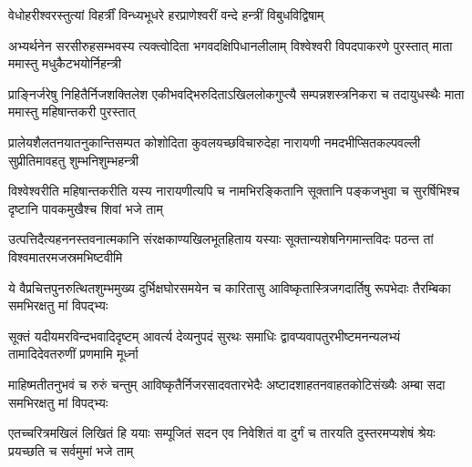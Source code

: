 

\twolineshloka
{वेधोहरीश्वरस्तुत्यां विहर्त्रीं विन्ध्यभूधरे}
{हरप्राणेश्वरीं वन्दे हन्त्रीं विबुधविद्विषाम्}%

\fourlineindentedshloka
{अभ्यर्थनेन सरसीरुहसम्भवस्य}
{त्यक्त्वोदिता भगवदक्षिपिधानलीलाम्}
{विश्वेश्वरी विपदपाकरणे पुरस्तात्}
{माता ममास्तु मधुकैटभयोर्निहन्त्री} %


\fourlineindentedshloka
{प्राङ्निर्जरेषु निहितैर्निजशक्तिलेश}
{एकीभवद्भिरुदिताऽखिललोकगुप्त्यै}
{सम्पन्नशस्त्रनिकरा च तदायुधस्थैः}
{माता ममास्तु महिषान्तकरी पुरस्तात्} %

\fourlineindentedshloka
{प्रालेयशैलतनयातनुकान्तिसम्पत}
{कोशोदिता कुवलयच्छविचारुदेहा}
{नारायणी नमदभीप्सितकल्पवल्ली}
{सुप्रीतिमावहतु शुम्भनिशुम्भहन्त्री} %


\fourlineindentedshloka
{विश्वेश्वरीति महिषान्तकरीति यस्य}
{नारायणीत्यपि च नामभिरङ्कितानि}
{सूक्तानि पङ्कजभुवा च सुरर्षिभिश्च}
{दृष्टानि पावकमुखैश्च शिवां भजे ताम्}


\fourlineindentedshloka
{उत्पत्तिदैत्यहननस्तवनात्मकानि}
{संरक्षकाण्यखिलभूतहिताय यस्याः}
{सूक्तान्यशेषनिगमान्तविदः पठन्त}
{तां विश्वमातरमजस्रमभिष्टवीमि} %

\fourlineindentedshloka
{ये वैप्रचित्तपुनरुत्थितशुम्भमुख्य}
{दुर्भिक्षघोरसमयेन च कारितासु}
{आविष्कृतास्त्रिजगदार्तिषु रूपभेदाः}
{तैरम्बिका समभिरक्षतु मां विपद्भ्यः} %


\fourlineindentedshloka
{सूक्तं यदीयमरविन्दभवादिदृष्टम्}
{आवर्त्य देव्यनुपदं सुरथः समाधिः}
{द्वावप्यवापतुरभीष्टमनन्यलभ्यं}
{तामादिदेवतरुणीं प्रणमामि मूर्ध्ना} %

\fourlineindentedshloka
{माहिष्मतीतनुभवं च रुरुं चन्तुम्}
{आविष्कृतैर्निजरसादवतारभेदैः}
{अष्टादशाहतनवाहतकोटिसंख्यैः}
{अम्बा सदा समभिरक्षतु मां विपद्भ्यः} %

\fourlineindentedshloka
{एतच्चरित्रमखिलं लिखितं हि ययाः}
{सम्पूजितं सदन एव निवेशितं वा}
{दुर्गं च तारयति दुस्तरमप्यशेषं}
{श्रेयः प्रयच्छति च सर्वमुमां भजे ताम्} %


